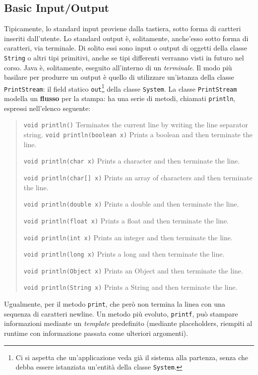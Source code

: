 \documentclass[\fontsizeclass,twocolumn]{\classname}
\theoremstyle{definition}
\theoremstyle{definition}
\begin{document}
\subsection{Basic Input/Output}

Tipicamente, lo standard input proviene dalla tastiera, sotto forma di cartteri
inseriti dall'utente. Lo standard output è, solitamente, anche'esso sotto forma
di caratteri, via terminale. Di solito essi sono input o output di oggetti
della classe \texttt{String} o altri tipi primitivi, anche se tipi differenti
verranno visti in futuro nel corso. Java è, solitamente, eseguito all'interno di
un \emph{terminale}. Il modo più basilare per produrre un output è quello di
utilizzare un'istanza della classe \texttt{PrintStream}: il field statico
\texttt{out}\footnote{Ci si aspetta che un'applicazione veda già il sistema
alla partenza, senza che debba essere istanziata un'entità della classe
\texttt{System}.} della classe \texttt{System}. La classe \texttt{PrintStream} modella
un \textbf{flusso} per la stampa: ha una serie di metodi, chiamati
\texttt{println}, espressi nell'elenco seguente:
\begin{quote}
\footnotesize{\texttt{void 	println()}	Terminates the current line by writing the line separator string.
\texttt{void 	println(boolean x)} 	Prints a boolean and then terminate the line.

\texttt{void 	println(char x)} 	Prints a character and then terminate the line.

\texttt{void 	println(char[] x)} 	Prints an array of characters and then terminate the line.

\texttt{void 	println(double x)} 	Prints a double and then terminate the line.

\texttt{void 	println(float x)} 	Prints a float and then terminate the line.

\texttt{void 	println(int x)} 	Prints an integer and then terminate the line.

\texttt{void 	println(long x)} 	Prints a long and then terminate the line.

\texttt{void 	println(Object x)} 	Prints an Object and then terminate the line.

\texttt{void 	println(String x)} 	Prints a String and then terminate the line.}
\end{quote}

Ugualmente, per il metodo \texttt{print}, che però non termina la linea con una
sequenza di caratteri newline. Un metodo più evoluto, \texttt{printf}, può
stampare informazioni mediante un \emph{template} predefinito (mediante
placeholders, riempiti al runtime con informazione passata come ulteriori
argomenti).
\end{document}
